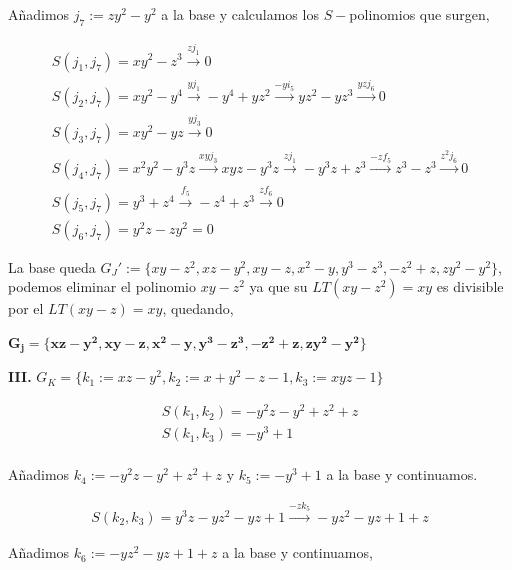 \documentclass{article}
\begin{document}
Añadimos $j_7:=zy^2 - y^2$ a la base y calculamos los $S-$polinomios que
surgen,

\begin{equation}
    \begin{array}{l}
        S(j_1,j_7) = xy^2 -z^3 \xrightarrow{z j_1} 0 \\
        S(j_2,j_7) = xy^2 -y^4 \xrightarrow{y j_1} -y^4 + yz^2 \xrightarrow{-y i_5} yz^2 -yz^3 \xrightarrow{yz j_6} 0\\
        S(j_3,j_7) = xy^2 - yz \xrightarrow{y j_3} 0\\
        S(j_4,j_7) = x^2y^2 - y^3z \xrightarrow{xy j_3} xyz - y^3z \xrightarrow{z j_1} -y^3z+z^3 \xrightarrow{-z f_5}z^3 -z^3 \xrightarrow{z^2 j_6} 0\\
        S(j_5,j_7) = y^3 + z^4 \xrightarrow{f_5} -z^4 + z^3 \xrightarrow{zf_6} 0\\
        S(j_6,j_7) = y^2z - zy^2 = 0
    \end{array}
\end{equation}

La base queda
$G_J':=\{ xy-z^2, xz - y^2, xy -z, x^2-y, y^3 -z^3, -z^2 + z, zy^2-y^2\}$,
podemos eliminar el polinomio $xy -z^2$ ya que su $LT(xy-z^2) = xy$ es
divisible por el $LT(xy-z)=xy$, quedando,

\bigskip

\textbf{$\boldsymbol{G_j=\{ xz - y^2, xy -z, x^2-y, y^3 -z^3, -z^2 + z, zy^2-y^2 \}}$}
~

\bigskip

    \textbf{III.} $G_K=\{k_1:=xz - y^2, k_2:=x + y^2 -z - 1, k_3:=xyz - 1\}$

\begin{equation}
    \begin{array}{l}
        S(k_1, k_2) = -y^2z -y^2 +z^2 + z\\
        S(k_1, k_3) = -y^3 + 1\\
    \end{array}
\end{equation}

Añadimos $k_4:=-y^2z - y^2 + z^2 +z$ y $k_5:=-y^3 + 1$ a la base y
continuamos.

\begin{equation}
    \begin{array}{l}
        S(k_2, k_3) = y^3z - yz^2 -yz + 1 \xrightarrow{-zk_5} -yz^2 -yz + 1 + z
    \end{array}
\end{equation}

Añadimos $k_6:=-yz^2 - yz + 1 + z$ a la base y continuamos,
\end{document}
